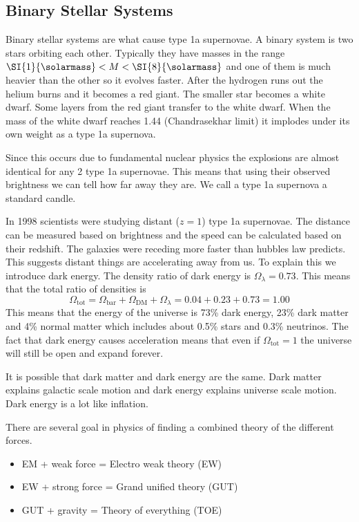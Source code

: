 \subsection*{Binary Stellar Systems}

Binary stellar systems are what cause type 1a supernovae. A binary system is two stars orbiting each other. Typically they have masses in the range \(\SI{1}{\solarmass}<M<\SI{8}{\solarmass}\) and one of them is much heavier than the other so it evolves faster. After the hydrogen runs out the helium burns and it becomes a red giant. The smaller star becomes a white dwarf. Some layers from the red giant transfer to the white dwarf. When the mass of the white dwarf reaches \SI{1.44}{\solarmass} (Chandrasekhar limit) it implodes under its own weight as a type 1a supernova.

Since this occurs due to fundamental nuclear physics the explosions are almost identical for any 2 type 1a supernovae. This means that using their observed brightness we can tell how far away they are. We call a type 1a supernova a standard candle.

In 1998 scientists were studying distant (\(z=1\)) type 1a supernovae. The distance can be measured based on brightness and the speed can be calculated based on their redshift. The galaxies were receding more faster than hubbles law predicts. This suggests distant things are accelerating away from us. To explain this we introduce dark energy. The density ratio of dark energy is \(\Omega_\lambda=0.73\). This means that the total ratio of densities is
\[\Omega_\mathrm{tot}=\Omega_\mathrm{bar}+\Omega_\mathrm{DM}+\Omega_\lambda=0.04+0.23+0.73=1.00\]
This means that the energy of the universe is 73\% dark energy, 23\% dark matter and 4\% normal matter which includes about 0.5\% stars and 0.3\% neutrinos. The fact that dark energy causes acceleration means that even if \(\Omega_\mathrm{tot}=1\) the universe will still be open and expand forever.

It is possible that dark matter and dark energy are the same. Dark matter explains galactic scale motion and dark energy explains universe scale motion. Dark energy is a lot like inflation.

There are several goal in physics of finding a combined theory of the different forces.
\begin{itemize}
\item EM + weak force = Electro weak theory (EW)
\item EW + strong force = Grand unified theory (GUT)
\item GUT + gravity = Theory of everything (TOE)
\end{itemize}
